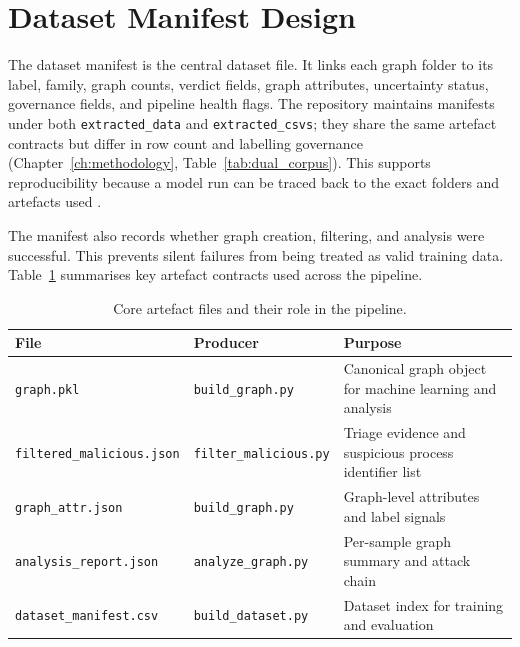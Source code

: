 \section{Dataset Manifest Design}

The dataset manifest is the central dataset file. It links each graph folder to its label, family, graph counts, verdict fields, graph attributes, uncertainty status, governance fields, and pipeline health flags. The repository maintains manifests under both \texttt{extracted\_data} and \texttt{extracted\_csvs}; they share the same artefact contracts but differ in row count and labelling governance (Chapter~\ref{ch:methodology}, Table~\ref{tab:dual_corpus}). This supports reproducibility because a model run can be traced back to the exact folders and artefacts used \cite{goodman2016reproducibility}.

The manifest also records whether graph creation, filtering, and analysis were successful. This prevents silent failures from being treated as valid training data. Table~\ref{tab:artefact_contracts} summarises key artefact contracts used across the pipeline.

\begin{table}[htbp]
\centering
\caption{Core artefact files and their role in the pipeline.}
\label{tab:artefact_contracts}
\footnotesize
\setlength{\tabcolsep}{4pt}
\renewcommand{\arraystretch}{1.25}
\begin{tabularx}{\textwidth}{@{}>{\raggedright\arraybackslash}p{} >{\raggedright\arraybackslash}p{} >{\raggedright\arraybackslash}X@{}}
\toprule
\textbf{File} & \textbf{Producer} & \textbf{Purpose} \\
\midrule
\texttt{graph.pkl} & \texttt{build\_graph.py} & Canonical graph object for machine learning and analysis \\
\texttt{filtered\_malicious.json} & \texttt{filter\_malicious.py} & Triage evidence and suspicious process identifier list \\
\texttt{graph\_attr.json} & \texttt{build\_graph.py} & Graph-level attributes and label signals \\
\texttt{analysis\_report.json} & \texttt{analyze\_graph.py} & Per-sample graph summary and attack chain \\
\texttt{dataset\_manifest.csv} & \texttt{build\_dataset.py} & Dataset index for training and evaluation \\
\bottomrule
\end{tabularx}
\end{table}

